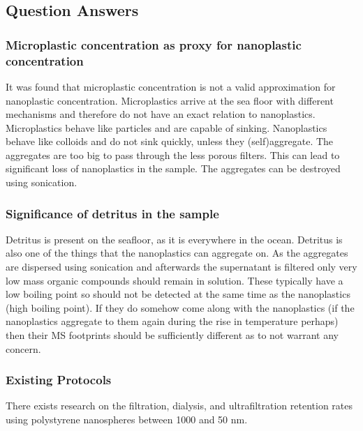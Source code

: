\documentclass[twocolumn,a4paper,aps,amsmath,amssymb,floatfix,superscriptaddress]{revtex4-2}
\begin{document}
	\subsection{Question Answers}
	\subsubsection{}
	
	\subsubsection{}
	
	\subsubsection{Microplastic concentration as proxy for nanoplastic concentration}
	It was found that microplastic concentration is not a valid approximation for nanoplastic concentration. Microplastics arrive at the sea floor with different mechanisms and therefore do not have an exact relation to nanoplastics. \cite{Vertical flux of microplastic} \cite{MP in Atlantic deep waters} Microplastics behave like particles and are capable of sinking. Nanoplastics behave like colloids and do not sink quickly, unless they (self)aggregate. \cite{Aggregation of NP, what we know} The aggregates are too big to pass through the less porous filters. This can lead to significant loss of nanoplastics in the sample. The aggregates can be destroyed using sonication. \cite{Heteroaggregation, disaggregation} 
	\subsubsection{Significance of detritus in the sample}
	Detritus is present on the seafloor, as it is everywhere in the ocean. Detritus is also one of the things that the nanoplastics can aggregate on. As the aggregates are dispersed using sonication and afterwards the supernatant is filtered only very low mass organic compounds should remain in solution. These typically have a low boiling point so should not be detected at the same time as the nanoplastics (high boiling point). \cite{McMurry} If they do somehow come along with the nanoplastics (if the nanoplastics aggregate to them again during the rise in temperature perhaps) then their MS footprints should be sufficiently different as to not warrant any concern.
	\subsubsection{Existing Protocols}
	There exists research on the filtration, dialysis, and ultrafiltration retention rates using polystyrene nanospheres between 1000 and 50 nm.\cite{Assessment of nanoplastic extraction}
	
\end{document}
